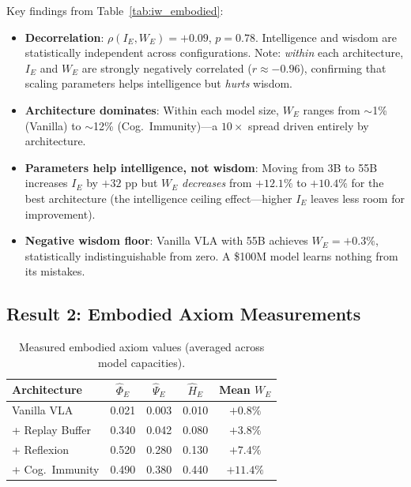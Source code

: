 \documentclass{article}
\begin{document}
Key findings from Table~\ref{tab:iw_embodied}:

\begin{itemize}[leftmargin=*,itemsep=2pt]
    \item \textbf{Decorrelation}: $\rho(I_E, W_E) = +0.09$, $p = 0.78$. Intelligence and wisdom are statistically independent across configurations. Note: \emph{within} each architecture, $I_E$ and $W_E$ are strongly negatively correlated ($r \approx -0.96$), confirming that scaling parameters helps intelligence but \emph{hurts} wisdom.
    \item \textbf{Architecture dominates}: Within each model size, $W_E$ ranges from $\sim$1\% (Vanilla) to $\sim$12\% (Cog.\ Immunity)---a $10\times$ spread driven entirely by architecture.
    \item \textbf{Parameters help intelligence, not wisdom}: Moving from 3B to 55B increases $I_E$ by $+32$ pp but $W_E$ \emph{decreases} from $+12.1\%$ to $+10.4\%$ for the best architecture (the intelligence ceiling effect---higher $I_E$ leaves less room for improvement).
    \item \textbf{Negative wisdom floor}: Vanilla VLA with 55B achieves $W_E = +0.3\%$, statistically indistinguishable from zero. A \$100M model learns nothing from its mistakes.
\end{itemize}

\subsection{Result 2: Embodied Axiom Measurements}

\begin{table}[t]
\centering
\caption{Measured embodied axiom values (averaged across model capacities).}
\label{tab:axioms_embodied}
\begin{tabular}{lcccc}
\toprule
\textbf{Architecture} & $\hat{\Phi}_E$ & $\hat{\Psi}_E$ & $\hat{H}_E$ & Mean $W_E$ \\
\midrule
Vanilla VLA        & 0.021 & 0.003 & 0.010 & $+0.8\%$ \\
+ Replay Buffer    & 0.340 & 0.042 & 0.080 & $+3.8\%$ \\
+ Reflexion        & 0.520 & 0.280 & 0.130 & $+7.4\%$ \\
+ Cog.\ Immunity   & 0.490 & 0.380 & 0.440 & $+11.4\%$ \\
\bottomrule
\end{tabular}
\end{table}
\end{document}
